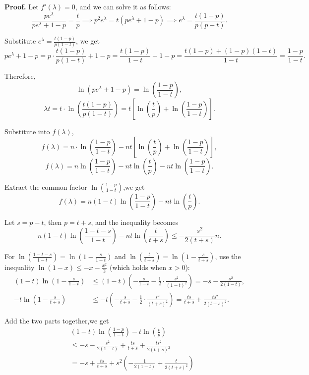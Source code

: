 \documentclass[a4paper, 11pt]{article}
\newenvironment{solution}
    {\textbf{Proof.}}
    {}
\begin{document}
\begin{solution}
Let \( f'(\lambda) = 0 \), and we can solve it as follows:
$$
\frac{pe^\lambda}{pe^\lambda + 1 - p} = \frac{t}{p} \implies p^2e^\lambda = t(pe^\lambda + 1 - p) \implies e^\lambda = \frac{t(1 - p)}{p(p - t)}.
$$

Substitute \( e^\lambda = \frac{t(1 - p)}{p(1 - t)} \), we get
$$
pe^\lambda + 1 - p = p \cdot \frac{t(1 - p)}{p(1 - t)} + 1 - p = \frac{t(1 - p)}{1 - t} + 1 - p =\frac{t(1 - p)+(1 - p)(1 - t)}{1 - t}=\frac{1 - p}{1 - t}.
$$

Therefore,
$$
\ln\left(pe^\lambda + 1 - p\right)=\ln\left(\frac{1 - p}{1 - t}\right),
$$
$$
\lambda t=t\cdot\ln\left(\frac{t(1 - p)}{p(1 - t)}\right)=t\left[\ln\left(\frac{t}{p}\right)+\ln\left(\frac{1 - p}{1 - t}\right)\right].
$$

Substitute into \( f(\lambda) \),
$$
f(\lambda)=n\cdot\ln\left(\frac{1 - p}{1 - t}\right)-nt\left[\ln\left(\frac{t}{p}\right)+\ln\left(\frac{1 - p}{1 - t}\right)\right],
$$
$$
f(\lambda)=n\ln\left(\frac{1 - p}{1 - t}\right)-nt\ln\left(\frac{t}{p}\right)-nt\ln\left(\frac{1 - p}{1 - t}\right).
$$

Extract the common factor \( \ln\left(\frac{1 - p}{1 - t}\right) \),we get
$$
f(\lambda)=n(1 - t)\ln\left(\frac{1 - p}{1 - t}\right)-nt\ln\left(\frac{t}{p}\right).
$$

Let \( s = p - t \), then \( p = t + s \), and the inequality becomes
$$
n(1 - t)\ln\left( \frac{1 - t - s}{1 - t} \right) - nt\ln\left( \frac{t}{t + s} \right) \leq -\frac{s^2}{2(t + s)}n.
$$

For \( \ln\left( \frac{1 - t - s}{1 - t} \right) = \ln\left( 1 - \frac{s}{1 - t} \right) \) and \( \ln\left( \frac{t}{t + s} \right) = \ln\left( 1 - \frac{s}{t + s} \right) \), use the inequality \( \ln(1 - x) \leq -x - \frac{x^2}{2} \) (which holds when \( x > 0 \)):
\begin{align*}
	(1 - t)\ln\left( 1 - \frac{s}{1 - t} \right) &\leq (1 - t)\left( -\frac{s}{1 - t} - \frac{1}{2} \cdot \frac{s^2}{(1 - t)^2} \right) = -s - \frac{s^2}{2(1 - t)} ,\\
	-t\ln\left( 1 - \frac{s}{t + s} \right) &\leq -t\left( -\frac{s}{t + s} - \frac{1}{2} \cdot \frac{s^2}{(t + s)^2} \right) = \frac{ts}{t + s} + \frac{ts^2}{2(t + s)^2}.
\end{align*}

Add the two parts together,we get
\begin{align*}
	&(1 - t)\ln\left( \frac{1 - p}{1 - t} \right) - t\ln\left( \frac{t}{p} \right) \\
	&\leq -s - \frac{s^2}{2(1 - t)} + \frac{ts}{t + s} + \frac{ts^2}{2(t + s)^2} \\
	&= -s + \frac{ts}{t + s} + s^2\left( -\frac{1}{2(1 - t)} + \frac{t}{2(t + s)^2} \right)
\end{align*}


\end{solution}
\end{document}
